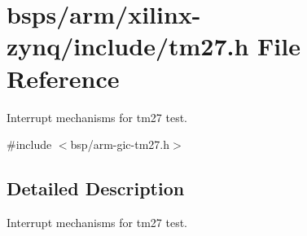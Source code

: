 \hypertarget{arm_2xilinx-zynq_2include_2tm27_8h}{}\section{bsps/arm/xilinx-\/zynq/include/tm27.h File Reference}
\label{arm_2xilinx-zynq_2include_2tm27_8h}


Interrupt mechanisms for tm27 test.  


{\ttfamily \#include $<$bsp/arm-\/gic-\/tm27.\+h$>$}\newline


\subsection{Detailed Description}
Interrupt mechanisms for tm27 test. 

